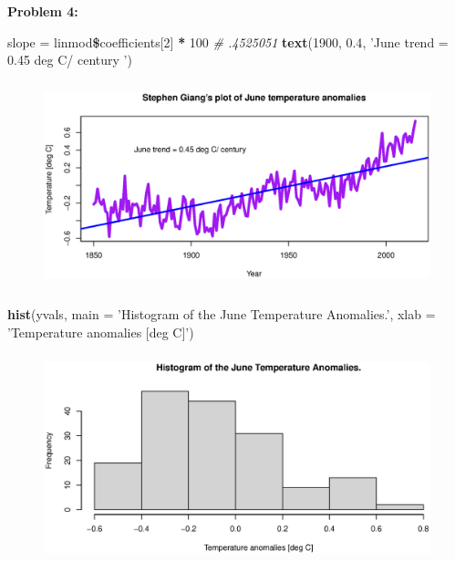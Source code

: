 \documentclass[11pt]{article}
\newenvironment{problem}[1]{\textbf{Problem #1: }}{\newpage}
\newenvironment{Shaded}{\begin{snugshade}}{\end{snugshade}}
\newcommand{\CommentTok}[1]{\textcolor[rgb]{0.56,0.35,0.01}{\textit{#1}}}
\newcommand{\DataTypeTok}[1]{\textcolor[rgb]{0.13,0.29,0.53}{#1}}
\newcommand{\DecValTok}[1]{\textcolor[rgb]{0.00,0.00,0.81}{#1}}
\newcommand{\FloatTok}[1]{\textcolor[rgb]{0.00,0.00,0.81}{#1}}
\newcommand{\KeywordTok}[1]{\textcolor[rgb]{0.13,0.29,0.53}{\textbf{#1}}}
\newcommand{\NormalTok}[1]{#1}
\newcommand{\OperatorTok}[1]{\textcolor[rgb]{0.81,0.36,0.00}{\textbf{#1}}}
\newcommand{\StringTok}[1]{\textcolor[rgb]{0.31,0.60,0.02}{#1}}
\begin{document}
\begin{problem}{4}
\begin{enumerate}[label = (\roman*)]
\begin{Shaded}
\begin{Highlighting}[]
\NormalTok{slope =}\StringTok{ }\NormalTok{linmod}\OperatorTok{\$}\NormalTok{coefficients[}\DecValTok{2}\NormalTok{] }\OperatorTok{*}\StringTok{ }\DecValTok{100} \CommentTok{# .4525051}
\KeywordTok{text}\NormalTok{(}\DecValTok{1900}\NormalTok{, }\FloatTok{0.4}\NormalTok{, }\StringTok{'June trend = 0.45 deg C/ century '}\NormalTok{)}
\end{Highlighting}
\end{Shaded}
		\begin{figure}[h!]
			\centering
			\includegraphics[height = 6cm]{SGTemp}
		\end{figure}
\begin{Shaded}
\begin{Highlighting}[]
\KeywordTok{hist}\NormalTok{(yvals, }\DataTypeTok{main =} \StringTok{'Histogram of the June Temperature Anomalies.'}\NormalTok{, }
     \DataTypeTok{xlab =} \StringTok{'Temperature anomalies [deg C]'}\NormalTok{)}
\end{Highlighting}
\end{Shaded}
		\begin{figure}[h!]
			\centering
			\includegraphics[height = 6cm]{SGHist}
		\end{figure}
		
		\end{enumerate}
	\end{problem}
\end{document}

